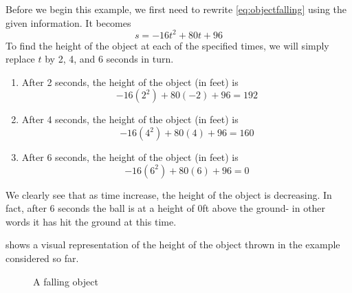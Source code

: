 \begin{myProof}
	Before we begin this example, we first need to rewrite \cref{eq:objectfalling} using
	the given information. It becomes
	\[
		s = -16t^2+80t+96
	\]
	To find the height of the object at each of the specified times, we will simply replace $t$ by 2, 4, and 6 seconds in turn.
	\begin{enumerate}
		\item After 2 seconds, the height of the object (in feet) is
		\[
			-16(2^2)+80(-2)+96 = 192
		\]
		\item After 4 seconds, the height of the object (in feet) is
		\[
			-16(4^2)+80(4)+96=160
		\]
		\item After 6 seconds, the height of the object (in feet) is
		\[
			-16(6^2)+80(6)+96=0
		\]
	\end{enumerate} 
	We clearly see that as time increase, the height of the object is decreasing. In fact, after
	6 seconds the ball is at a height of 0ft above the ground- in other words it has hit the ground
	at this time.
				
	 shows a visual representation of the height of the object thrown in 
	the example considered so far.
				
	\begin{figure}[!h]
		\centering
		\caption{A falling object}
		\label{fig:fallingobject2}
	\end{figure}
	\FloatBarrier
				

\end{myProof}
